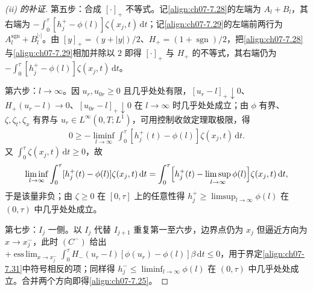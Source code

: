 \documentclass[../../main.tex]{subfiles}%
\begin{document}
\begin{proof}[(ii) 的补证]
第五步：合成 $[\cdot]_+$ 不等式。记\eqref{align:ch07-7.28}的左端为 $A_l+B_l$，其右端为 $-\int_0^\tau[h_j^+-\phi(l)]\zeta(x_j,t)\,\mathrm{d}t$；记\eqref{align:ch07-7.29}的左端前两行为 $A_l^{\mathrm{sgn}}+B_l^{|\cdot|}$。由 $[y]_+=(y+|y|)/2$、$H_+=(1+\operatorname{sgn})/2$，把\eqref{align:ch07-7.28}与\eqref{align:ch07-7.29}相加并除以 $2$ 即得 $[\cdot]_+$ 与 $H_+$ 的不等式，其右端仍为 $-\int_0^\tau[h_j^+-\phi(l)]\zeta(x_j,t)\,\mathrm{d}t$。

第六步：$l\to\infty$。因 $u_r,u_{0r}\geqslant0$ 且几乎处处有限，$[u_r-l]_+\downarrow0$、$H_+(u_r-l)\to0$、$[u_{0r}-l]_+\downarrow0$ 在 $l\to\infty$ 时几乎处处成立；由 $\phi$ 有界、$\zeta,\zeta_t,\zeta_x$ 有界与 $u_r\in L^\infty(0,T;L^1)$，可用控制收敛定理取极限，得
\begin{align*}
0\geqslant-\liminf_{l\to\infty}\int_0^\tau[h_j^+(t)-\phi(l)]\zeta(x_j,t)\,\mathrm{d}t.
\end{align*}
又 $\int_0^\tau\zeta(x_j,t)\,\mathrm{d}t\geqslant0$，故
\begin{align*}
\liminf_{l\to\infty}\int_0^\tau[h_j^+(t)-\phi(l)]\zeta(x_j,t)\,\mathrm{d}t
=\int_0^\tau\Bigl[h_j^+(t)-\limsup_{l\to\infty}\phi(l)\Bigr]\zeta(x_j,t)\,\mathrm{d}t,
\end{align*}
于是该量非负；由 $\zeta\geqslant0$ 在 $[0,\tau]$ 上的任意性得 $h_j^+\geqslant\limsup_{l\to\infty}\phi(l)$ 在 $(0,\tau)$ 中几乎处处成立。

第七步：$I_j$ 一侧。以 $I_j$ 代替 $I_{j+1}$ 重复第一至六步，边界点仍为 $x_j$ 但逼近方向为 $x\to x_j^-$，此时 $(C^-)$ 给出 $+\operatorname*{ess\,lim}_{x\to x_j^-}\int_0^\tau H_-(u_r-l)[\phi(u_r)-\phi(l)]\beta\,\mathrm{d}t\leqslant0$，用于界定\eqref{align:ch07-7.31}中符号相反的项；同样得 $h_j^-\leqslant\liminf_{l\to\infty}\phi(l)$ 在 $(0,\tau)$ 中几乎处处成立。合并两个方向即得\eqref{align:ch07-7.25}。
\end{proof}
\end{document}
